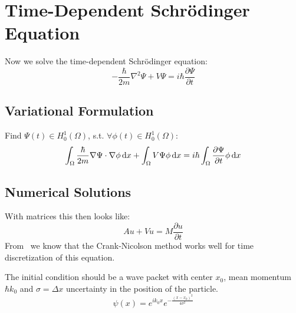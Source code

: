 \documentclass[a4paper,11pt]{scrartcl}
\newcommand*{\dx}{\dif{}x}
\begin{document}
\section{Time-Dependent Schrödinger Equation}
Now we solve the time-dependent Schrödinger equation:
\[ -\frac{\hbar}{2m} \nabla^2 \Psi + V \Psi = i \hbar \frac{\partial\Psi}{\partial{}t}\]

\subsection{Variational Formulation}

Find $\Psi(t) \in H^1_0(\Omega)$, s.t. $\forall \phi(t) \in H^1_0(\Omega)$:
\[ \int_{\Omega} \frac{\hbar}{2m} \nabla \Psi \cdot \nabla\phi \dx +
  \int_{\Omega} V \Psi \phi\dx = i \hbar\int_{\Omega}
  \frac{\partial\Psi}{\partial{}t} \phi\dx\]

\subsection{Numerical Solutions}
With matrices this then looks like:
\[A u + V u = M \frac{\partial{}u}{\partial{}t}\]
From~\cite{Sehra07} we know that the Crank-Nicolson method works well for time
discretization of this equation.\nocite{itutorial}

The initial condition should be a wave packet with center $x_0$, mean momentum
$\hbar k_0$ and $\sigma = \Delta x$ uncertainty in the position of the particle.
\[\psi(x) =  e^{ik_0x}e^{-\frac{(x-x_0)^2}{4\sigma^2}}\]

{}

\end{document}
